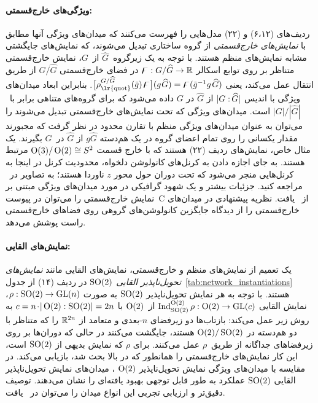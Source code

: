 \paragraph{ویژگی‌های خارج‌قسمتی:}
ردیف‌های (۶،۱۲) و (۲۲) مدل‌هایی را فهرست می‌کنند که میدان‌های ویژگی آنها مطابق با \emph{نمایش‌های خارج‌قسمتی} از گروه ساختاری تبدیل می‌شوند، که نمایش‌های جایگشتی مشابه نمایش‌های منظم هستند.
با توجه به یک زیرگروه~$\widehat{G}$ از~$G$، نمایش خارج‌قسمتی متناظر بر روی توابع اسکالر $\digamma: G/\widehat{G} \to \mathbb{R}$ در فضای خارج‌قسمتی $G/\widehat{G}$ از طریق انتقال عمل می‌کند، یعنی
$\big[\rho_\textup{\lr{quot}}^{G/\widehat{G}} (\tilde{g})\mkern2mu \digamma\big] (g\mkern1mu \widehat{G}) = \digamma(\tilde{g}^{-1}g \mkern2mu \widehat{G})$.
بنابراین ابعاد میدان‌های ویژگی با اندیس ${|G:\mkern-2mu\widehat{G}|}$ از $\widehat{G}$ در $G$ داده می‌شود که برای گروه‌های متناهی برابر با~$|G|/|\widehat{G}|$ است.
میدان‌های ویژگی که تحت نمایش‌های خارج‌قسمتی تبدیل می‌شوند را می‌توان به عنوان میدان‌های ویژگی منظم با تقارن محدود در نظر گرفت که مجبورند مقدار یکسانی را روی تمام اعضای گروه در یک هم‌دسته $g\widehat{G}$ از $\widehat{G}$ در~$G$ بگیرند.
یک مثال خاص، نمایش‌های ردیف (۲۲) هستند که با خارج‌ قسمت $\operatorname{O}(3)/\operatorname{O}(2) \cong S^2$ مرتبط هستند.
به جای اجازه دادن به کرنل‌های کانولوشن دلخواه، محدودیت کرنل در اینجا به کرنل‌هایی منجر می‌شود که تحت دوران حول محور $z$ ناوردا هستند؛ به تصاویر در~\cite{janssen2018design} مراجعه کنید.
جزئیات بیشتر و یک شهود گرافیکی در مورد میدان‌های ویژگی مبتنی بر نمایش خارج‌قسمتی را می‌توان در پیوست~C از~\cite{Weiler2019_E2CNN} یافت.
نظریه پیشنهادی در \cite{Kondor2018-GENERAL} میدان‌های خارج‌قسمتی را از دیدگاه جایگزین کانولوشن‌های گروهی روی فضاهای خارج‌قسمتی راست پوشش می‌دهد.


\paragraph{نمایش‌های القایی:}
یک تعمیم از نمایش‌های منظم و خارج‌قسمتی، نمایش‌های القایی مانند \emph{نمایش‌های تحویل‌ناپذیر القایی $\operatorname{SO}(2)$} در ردیف (۱۴)
از جدول~\ref{tab:network_instantiations} هستند.
با توجه به هر نمایش تحویل‌ناپذیر $\operatorname{SO}(2)$ به صورت $\rho: \operatorname{SO}(2) \to \operatorname{GL}(n)$، نمایش القایی $\operatorname{Ind}_{\operatorname{SO}(2)}^{\operatorname{O}(2)}\rho: \operatorname{O}(2) \to \operatorname{GL}(c)$ از~$\operatorname{O}(2)$ با $c = n \mkern-2mu\cdot\! {|\operatorname{O}(2):\operatorname{SO}(2)|} = 2n$
به روش زیر عمل می‌کند:
بازتاب‌ها دو زیرفضای $n$-بعدی و متعامد از $\mathbb{R}^{2n}$ را که متناظر با دو هم‌دسته در $\operatorname{O}(2)/\operatorname{SO}(2)$ هستند، جایگشت می‌کنند در حالی که دوران‌ها بر روی زیرفضاهای جداگانه از طریق~$\rho$ عمل می‌کنند.
برای $\rho$ که نمایش بدیهی از $\operatorname{SO}(2)$ است، این کار نمایش‌های خارج‌قسمتی را همانطور که در بالا بحث شد، بازیابی می‌کند.
در مقایسه با میدان‌های ویژگی نمایش تحویل‌ناپذیر $\operatorname{O}(2)$ ، میدان‌های نمایش تحویل‌ناپذیر القایی $\operatorname{SO}(2)$ عملکرد به طور قابل توجهی بهبود یافته‌ای را نشان می‌دهند.
توصیف دقیق‌تر و ارزیابی تجربی این انواع میدان را می‌توان در~\cite{Weiler2019_E2CNN} یافت.


